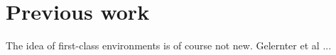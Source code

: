 \section{Previous work}

The idea of first-class environments is of course not new.
Gelernter et al \cite{Gelernter:1987:EFC:41625.41634} ...

\cite{Queinnec:1996:SCT:232627.232653}
